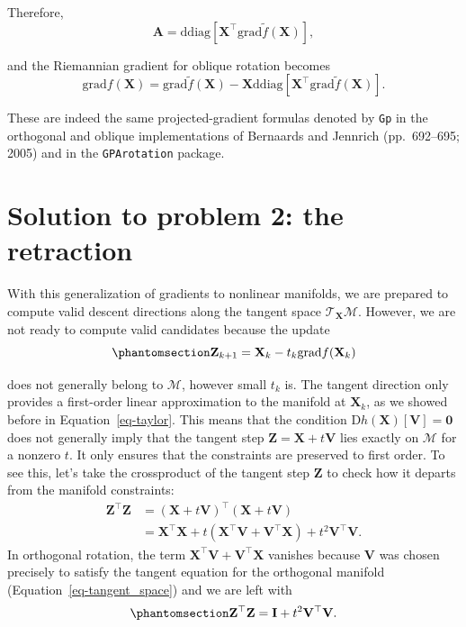 \documentclass[
  12pt,
  letterpaper,
  article]{scrartcl}
\begin{document}
Therefore, \[
\mathbf{A}
=
\mathrm{ddiag}
\left[
\mathbf{X}^\top
\text{grad}\tilde{f}(\mathbf{X})
\right],
\]

and the Riemannian gradient for oblique rotation becomes \[
\text{grad}f(\mathbf{X})
=
\text{grad}\tilde{f}(\mathbf{X})
-
\mathbf{X}
\mathrm{ddiag}
\left[
\mathbf{X}^\top
\text{grad}\tilde{f}(\mathbf{X})
\right].
\]

These are indeed the same projected-gradient formulas denoted by
\texttt{Gp} in the orthogonal and oblique implementations of Bernaards
and Jennrich (pp.~692--695; 2005) and in the \texttt{GPArotation}
package.

\section{Solution to problem 2: the
retraction}\label{solution-to-problem-2-the-retraction}

With this generalization of gradients to nonlinear manifolds, we are
prepared to compute valid descent directions along the tangent space
\(\mathcal{T}_{\mathbf{X}}\mathcal{M}\). However, we are not ready to
compute valid candidates because the update
\begin{equation}\protect\phantomsection\label{eq-tangent_step}{
\mathbf{Z}_{k+1} = \mathbf{X}_k-t_k\text{grad}f(\mathbf{X}_k)
}\end{equation}

does not generally belong to \(\mathcal{M}\), however small \(t_k\) is.
The tangent direction only provides a first-order linear approximation
to the manifold at \(\mathbf{X}_k\), as we showed before in
Equation~\ref{eq-taylor}. This means that the condition
\(\mathrm{D}h(\mathbf{X})[\mathbf{V}]=\mathbf{0}\) does not generally
imply that the tangent step \(\mathbf{Z} = \mathbf{X}+t\mathbf{V}\) lies
exactly on \(\mathcal{M}\) for a nonzero \(t\). It only ensures that the
constraints are preserved to first order. To see this, let's take the
crossproduct of the tangent step \(\mathbf{Z}\) to check how it departs
from the manifold constraints: \[
\begin{aligned}
\mathbf{Z}^\top \mathbf{Z} &=
(\mathbf{X}+t\mathbf{V})^\top (\mathbf{X}+t\mathbf{V}) \\
&= \mathbf{X}^\top\mathbf{X} + t(\mathbf{X}^\top\mathbf{V} + \mathbf{V}^\top\mathbf{X}) + t^2\mathbf{V}^\top\mathbf{V}.
\end{aligned}
\] In orthogonal rotation, the term
\(\mathbf{X}^\top\mathbf{V} + \mathbf{V}^\top\mathbf{X}\) vanishes
because \(\mathbf{V}\) was chosen precisely to satisfy the tangent
equation for the orthogonal manifold (Equation~\ref{eq-tangent_space})
and we are left with
\begin{equation}\protect\phantomsection\label{eq-cross_step_orth}{
\mathbf{Z}^\top \mathbf{Z} = \mathbf{I} + t^2\mathbf{V}^\top\mathbf{V}.
}\end{equation}
\end{document}
